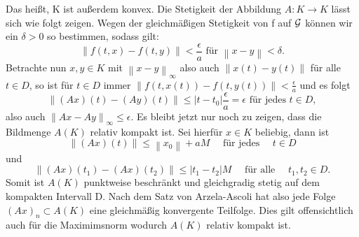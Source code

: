 Das heißt, K ist außerdem konvex. Die Stetigkeit der Abbildung $A:K \rightarrow K$ lässt sich wie folgt zeigen.
Wegen der gleichmäßigen Stetigkeit von f auf ${\cal G}$ können wir ein $\delta > 0$ so bestimmen, sodass gilt:
\[
    \left\lVert f(t,x) - f(t,y) \right\rVert < \frac{\epsilon}{a} \text{ für } \left\lVert x - y \right\rVert < \delta.
\]
Betrachte nun $x, y \in K$ mit $\left\lVert x - y \right\rVert_{\infty}$ also auch $\left\lVert x(t) - y(t) \right\rVert$
für alle $t \in D$, so ist für $t \in D$ immer $\left\lVert f(t,x(t)) - f(t,y(t)) \right\rVert < \frac{\epsilon}{a}$ und
es folgt
\[
    \left\lVert (Ax)(t) - (Ay)(t) \right\rVert \leq |t - t_0| \frac{\epsilon}{a} = \epsilon \text{ für jedes } t \in D,
\]
also auch $\left\lVert Ax - Ay \right\rVert_{\infty} \leq \epsilon$. Es bleibt jetzt nur noch zu zeigen, dass die
Bildmenge $A(K)$ relativ kompakt ist. Sei hierfür $x \in K$ beliebig, dann ist
\[
    \left\lVert (Ax)(t) \right\rVert \leq \left\lVert x_0 \right\rVert + aM \quad \text{ für jedes } \quad t \in D
\] und
\[
    \left\lVert (Ax)(t_1) - (Ax)(t_2) \right\rVert \leq |t_1 - t_2| M \quad \text{ für alle } \quad t_1,t_2 \in D.
\]
Somit ist $A(K)$ punktweise beschränkt und gleichgradig stetig auf dem kompakten Intervall D. Nach dem Satz von
Arzela-Ascoli \cite[49]{beckGewohnlicheDifferentialgleichungen2018} hat also jede Folge $(Ax)_n\subset A(K)$ eine
gleichmäßig konvergente Teilfolge. Dies gilt offensichtlich auch für die Maximimsnorm wodurch $A(K)$
relativ kompakt ist. \qedwhite\\


